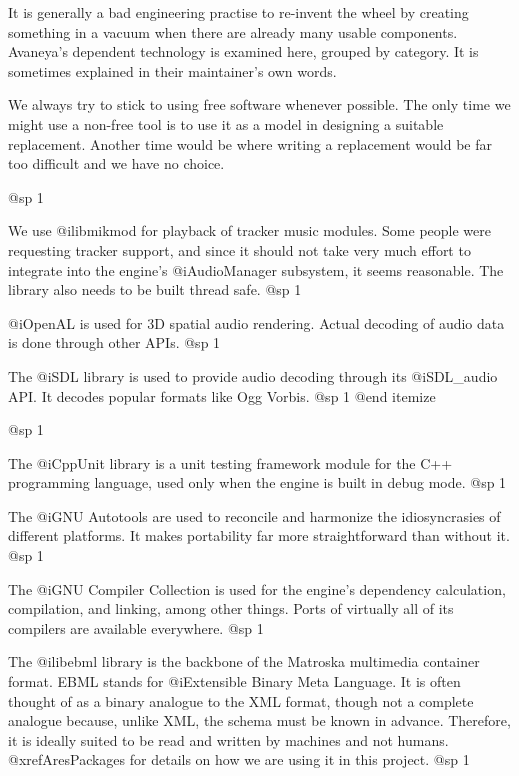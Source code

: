 It is generally a bad engineering practise to re-invent the wheel by creating something in a vacuum when there are already many usable components. Avaneya's dependent technology is examined here, grouped by category. It is sometimes explained in their maintainer's own words.

We always try to stick to using free software whenever possible. The only time we might use a non-free tool is to use it as a model in designing a suitable replacement. Another time would be where writing a replacement would be far too difficult and we have no choice.

@sp 1

\itemize
\item
We use @i{libmikmod} for playback of tracker music modules. Some people were requesting tracker support, and since it should not take very much effort to integrate into the engine's @i{AudioManager} subsystem, it seems reasonable. The library also needs to be built thread safe.
@sp 1

\item
@i{OpenAL} is used for 3D spatial audio rendering. Actual decoding of audio data is done through other APIs.
@sp 1

\item
The @i{SDL} library is used to provide audio decoding through its @i{SDL_audio} API. It decodes popular formats like Ogg Vorbis.
@sp 1
@end itemize

@sp 1

\itemize
\item
The @i{CppUnit} library is a unit testing framework module for the C++ programming language, used only when the engine is built in debug mode.
@sp 1

\item
The @i{GNU Autotools} are used to reconcile and harmonize the idiosyncrasies of different platforms. It makes portability far more straightforward than without it.
@sp 1

\item
The @i{GNU Compiler Collection} is used for the engine's dependency calculation, compilation, and linking, among other things. Ports of virtually all of its compilers are available everywhere.
@sp 1

\item
The @i{libebml} library is the backbone of the Matroska multimedia container format. EBML stands for @i{Extensible Binary Meta Language}. It is often thought of as a binary analogue to the XML format, though not a complete analogue because, unlike XML, the schema must be known in advance. Therefore, it is ideally suited to be read and written by machines and not humans. @xref{AresPackages} for details on how we are using it in this project.
@sp 1

